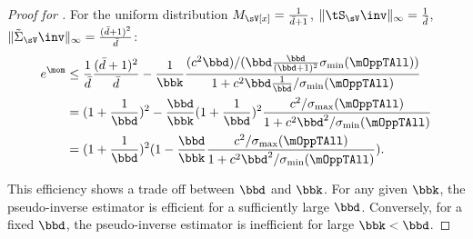 \begin{proof}[Proof for ]
  For the uniform distribution $M_\sV[x] = \frac{1}{\bar d + 1}$,
  $\|\tS_\sV\inv\|_\infty = \frac{1}{\bar d}$, $\|\tilde
  \Sigma_\sV\inv\|_\infty = \frac{(\bar d + 1)^2}{\bar d}$:
  \begin{align*}
    e^\mom 
    &\le \frac{1}{\bar d} \frac{(\bar d + 1)^2}{\bar d} 
    - \frac{1}{\bbk} \frac{
    (c^2 \bbd)/(\bbd \frac{\bbd}{(\bbd +1)^2} \sigma_{\min}(\mOppTAll))
    }{
    1 + c^2 \bbd \frac{1}{\bbd} / \sigma_{\min}(\mOppTAll)
    } \\
    &= (1 + \frac{1}{\bbd})^2 - \frac{\bbd}{\bbk} (1 + \frac{1}{\bbd})^2 \frac{c^2/\sigma_{\max}(\mOppTAll)}{1 + c^2 \bbd^2 / \sigma_{\min}(\mOppTAll)} \\
    &= (1 + \frac{1}{\bbd})^2 (1 - \frac{\bbd}{\bbk} \frac{c^2/\sigma_{\max}(\mOppTAll)}{1 + c^2 \bbd^2 / \sigma_{\min}(\mOppTAll)}).
  \end{align*}

  This efficiency shows a trade off between $\bbd$ and $\bbk$. For any
  given $\bbk$, the pseudo-inverse estimator is efficient for
  a sufficiently large $\bbd$. Conversely, for a fixed $\bbd$, the
  pseudo-inverse estimator is inefficient for large $\bbk < \bbd$.
   
\end{proof}

